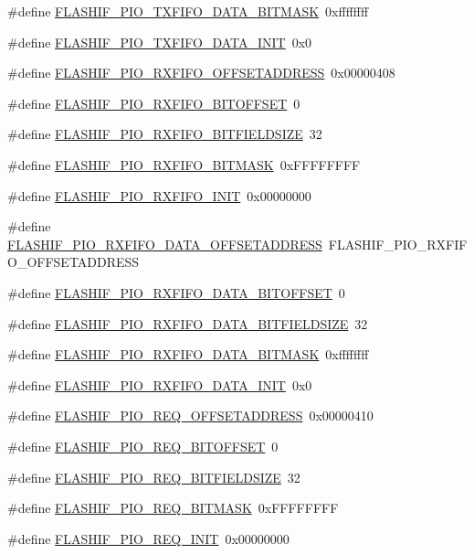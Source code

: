\begin{DoxyCompactItemize}
\item 
\#define \hyperlink{a00552_a4120f38e80fabe9392145474d52d6a00}{FLASHIF\_\-PIO\_\-TXFIFO\_\-DATA\_\-BITMASK}~0xffffffff
\item 
\#define \hyperlink{a00552_a649c5d95838ae5001eea8aba2835ed86}{FLASHIF\_\-PIO\_\-TXFIFO\_\-DATA\_\-INIT}~0x0
\item 
\#define \hyperlink{a00552_af5c12bb7ebbdafad9b1bb229b422a8b3}{FLASHIF\_\-PIO\_\-RXFIFO\_\-OFFSETADDRESS}~0x00000408
\item 
\#define \hyperlink{a00552_a72f41ff6f092fdbfa190d524f96dbeaa}{FLASHIF\_\-PIO\_\-RXFIFO\_\-BITOFFSET}~0
\item 
\#define \hyperlink{a00552_ab0b34b7ef79aff2c1b62e2978107344f}{FLASHIF\_\-PIO\_\-RXFIFO\_\-BITFIELDSIZE}~32
\item 
\#define \hyperlink{a00552_a3da2adfde68bbfcc7663613505444948}{FLASHIF\_\-PIO\_\-RXFIFO\_\-BITMASK}~0xFFFFFFFF
\item 
\#define \hyperlink{a00552_a7b71b5f58070f08c14e86a3a752bbb6c}{FLASHIF\_\-PIO\_\-RXFIFO\_\-INIT}~0x00000000
\item 
\#define \hyperlink{a00552_aa216438f73bda4906d031b0295e61df7}{FLASHIF\_\-PIO\_\-RXFIFO\_\-DATA\_\-OFFSETADDRESS}~FLASHIF\_\-PIO\_\-RXFIFO\_\-OFFSETADDRESS
\item 
\#define \hyperlink{a00552_aa8fd20190f5180726082dd9aba4eb021}{FLASHIF\_\-PIO\_\-RXFIFO\_\-DATA\_\-BITOFFSET}~0
\item 
\#define \hyperlink{a00552_aa2577e668d0fd362bf0f30b01bf92a58}{FLASHIF\_\-PIO\_\-RXFIFO\_\-DATA\_\-BITFIELDSIZE}~32
\item 
\#define \hyperlink{a00552_a09d6602b290a677d30b113d0a6e6f413}{FLASHIF\_\-PIO\_\-RXFIFO\_\-DATA\_\-BITMASK}~0xffffffff
\item 
\#define \hyperlink{a00552_a8d50c7c8eb765990d1c38c1c219e6d85}{FLASHIF\_\-PIO\_\-RXFIFO\_\-DATA\_\-INIT}~0x0
\item 
\#define \hyperlink{a00552_afc997c0155d60552396d36e75058ea06}{FLASHIF\_\-PIO\_\-REQ\_\-OFFSETADDRESS}~0x00000410
\item 
\#define \hyperlink{a00552_a3cf18f6ab867aede311047ebf648426f}{FLASHIF\_\-PIO\_\-REQ\_\-BITOFFSET}~0
\item 
\#define \hyperlink{a00552_abb70bc848ef280826de4bc984546b94e}{FLASHIF\_\-PIO\_\-REQ\_\-BITFIELDSIZE}~32
\item 
\#define \hyperlink{a00552_adde4bde9e28aa6cf25aed9e570001094}{FLASHIF\_\-PIO\_\-REQ\_\-BITMASK}~0xFFFFFFFF
\item 
\#define \hyperlink{a00552_a0d0cbb5ce6608b2bf1781c4f3893ad12}{FLASHIF\_\-PIO\_\-REQ\_\-INIT}~0x00000000

\end{DoxyCompactItemize}
